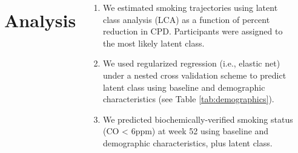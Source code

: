\documentclass[
	25pt,
	a0paper, 
	portrait,
	blockverticalspace=-3em,
	margin=.5in,
	innermargin=0mm
]{tikzposter}
\begin{document}
{\begin{columns}
\begin{minipage}[]{0.375\linewidth}
\begin{tikzfigure}
				\end{tikzfigure}
				
				
				\end{minipage}
				\begin{minipage}[]{0.29\linewidth}
					\large
					\section*{Analysis}
					\begin{enumerate}
						\raggedright
						\item We estimated smoking trajectories using latent class analysis (LCA) as a function of percent reduction in CPD.  Participants were assigned to the most likely latent class.
						
						\item We used regularized regression (i.e., elastic net) under a nested cross validation scheme to predict latent class using baseline and demographic characteristics (see Table \ref{tab:demographics}).
						
						\item We predicted biochemically-verified smoking status (CO < 6ppm) at week 52 using baseline and demographic characteristics, plus latent class.
						
					\end{enumerate}
								\vspace{1em}
				
				


			\end{minipage}
	\end{columns}

		}
	
\end{document}
